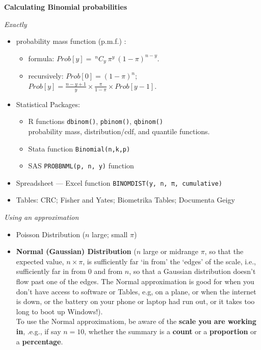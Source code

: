 \documentclass[]{book}
\begin{document}
\textbf{Calculating Binomial probabilities}

\emph{Exactly}

\begin{itemize}
\item
  probability mass function (p.m.f.) :

  \begin{itemize}
  \item
    formula: \(Prob[y] = \  ^n C _y \ \pi^y \  (1 − \pi)^{n−y}\).
  \item
    recursively: \(Prob[0] = (1−\pi)^n\); ~~ \(Prob[y] = \frac{n−y+1}{y} \times \frac{\pi}{1-\pi} \times Prob[y−1]\).
  \end{itemize}
\item
  Statistical Packages:

  \begin{itemize}
  \item
    R functions \texttt{dbinom()}, \texttt{pbinom()}, \texttt{qbinom()}\\
    probability mass, distribution/cdf, and quantile functions.
  \item
    Stata function \texttt{Binomial(n,k,p)}
  \item
    SAS \texttt{PROBBNML(p,\ n,\ y)} function
  \end{itemize}
\item
  Spreadsheet --- Excel function \texttt{BINOMDIST(y,\ n,\ π,\ cumulative)}
\item
  Tables: CRC; Fisher and Yates; Biometrika Tables; Documenta Geigy
\end{itemize}

\emph{Using an approximation}

\begin{itemize}
\item
  Poisson Distribution (\(n\) large; small \(\pi\))
\item
  \textbf{Normal (Gaussian) Distribution} (\(n\) large or midrange \(\pi\), so that the expected value, \(n \times \pi\), is sufficiently far `in from' the `edges' of the scale, i.e., sufficiently far in from 0 and from \(n\), so that a Gaussian distribution doesn't flow past one of the edges. The Normal approximation is good for when you don't have access to software or Tables, e.g, on a plane, or when the internet is down, or the battery on your phone or laptop had run out, or it takes too long to boot up Windows!).\\
  To use the Normal approximatiom, be aware of the \textbf{scale you are working in}, .e.g., if say \(n = 10\), whether the summary is a \textbf{count} or a \textbf{proportion} or a \textbf{percentage}.
\end{itemize}
\end{document}
